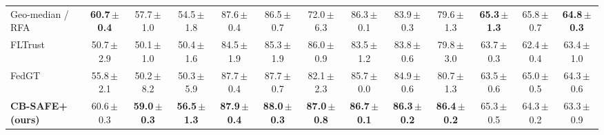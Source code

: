 \begin{table}[!t]
\begin{tabular}{@{}lcccccccccccc@{}}
Geo-median / RFA~\cite{rfa} & \textbf{60.7\,{\scriptsize$\pm$0.4}} & 57.7\,{\scriptsize$\pm$1.0} & 54.5\,{\scriptsize$\pm$1.8} & 87.6\,{\scriptsize$\pm$0.4} & 86.5\,{\scriptsize$\pm$0.7} & 72.0\,{\scriptsize$\pm$6.3} & 86.3\,{\scriptsize$\pm$0.1} & 83.9\,{\scriptsize$\pm$0.3} & 79.6\,{\scriptsize$\pm$1.3} & \textbf{65.3\,{\scriptsize$\pm$1.3}} & 65.8\,{\scriptsize$\pm$0.7} & \textbf{64.8\,{\scriptsize$\pm$0.3}}\\
FLTrust~\cite{fltrust} & 50.7\,{\scriptsize$\pm$2.9} & 50.1\,{\scriptsize$\pm$1.0} & 50.4\,{\scriptsize$\pm$1.6} & 84.5\,{\scriptsize$\pm$1.9} & 85.3\,{\scriptsize$\pm$1.9} & 86.0\,{\scriptsize$\pm$0.9} & 83.5\,{\scriptsize$\pm$1.2} & 83.8\,{\scriptsize$\pm$0.6} & 79.8\,{\scriptsize$\pm$3.0} & 63.7\,{\scriptsize$\pm$0.3} & 62.4\,{\scriptsize$\pm$0.4} & 63.4\,{\scriptsize$\pm$1.0}\\
FedGT~\cite{fedgt} & 55.8\,{\scriptsize$\pm$2.1} & 50.2\,{\scriptsize$\pm$8.2} & 50.3\,{\scriptsize$\pm$5.9} & 87.7\,{\scriptsize$\pm$0.4} & 87.7\,{\scriptsize$\pm$0.7} & 82.1\,{\scriptsize$\pm$2.3} & 85.7\,{\scriptsize$\pm$0.0} & 84.9\,{\scriptsize$\pm$0.6} & 80.7\,{\scriptsize$\pm$1.3} & 63.5\,{\scriptsize$\pm$0.6} & 65.0\,{\scriptsize$\pm$0.5} & 64.3\,{\scriptsize$\pm$0.6}\\
\textbf{CB-SAFE+ (ours)} & 60.6\,{\scriptsize$\pm$0.3} & \textbf{59.0\,{\scriptsize$\pm$0.3}} & \textbf{56.5\,{\scriptsize$\pm$1.3}} & \textbf{87.9\,{\scriptsize$\pm$0.4}} & \textbf{88.0\,{\scriptsize$\pm$0.3}} & \textbf{87.0\,{\scriptsize$\pm$0.8}} & \textbf{86.7\,{\scriptsize$\pm$0.1}} & \textbf{86.3\,{\scriptsize$\pm$0.2}} & \textbf{86.4\,{\scriptsize$\pm$0.2}} & 65.3\,{\scriptsize$\pm$0.5} & 64.3\,{\scriptsize$\pm$0.2} & 63.3\,{\scriptsize$\pm$0.9}\\
\bottomrule\end{tabular}
\end{table}